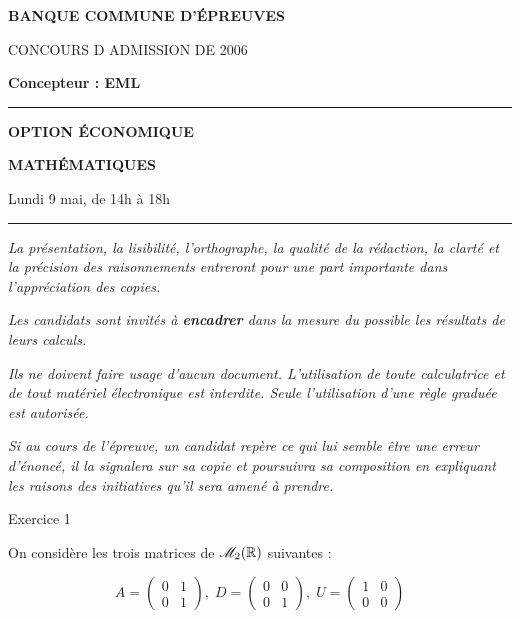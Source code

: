 \documentclass[11pt]{article}%
\begin{document}

\begin{center}
{\LARG\E\textbf{BANQUE COMMUNE D'ÉPREUVES}}



{\large \textsc{CONCOURS D ADMISSION DE 2006}}



{\large \textbf{Concepteur : EML}}



\rule{2.39cm}{0.05cm}



{\Large \textbf{OPTION ÉCONOMIQUE}}



{\Large \textbf{MATHÉMATIQUES }}



{\Large Lundi 9 mai, de 14h à 18h}



\rule{2.39cm}{0.05cm}
\end{center}

\textit{La présentation, la lisibilité, l'orthographe, la qualité
de la rédaction, la clarté et la précision des raisonnements
entreront pour une part importante dans l'appréciation des copies.}

\textit{Les candidats sont invités à \textbf{encadrer} dans la mesure
du possible les résultats de leurs calculs.}

\textit{Ils ne doivent faire usage d'aucun document. L'utilisation de
toute
calculatrice et de tout matériel électronique est interdite. Seule
l'utilisation d'une règle graduée est autorisée.}

\textit{Si au cours de l'épreuve, un candidat repère ce qui lui semble
être une erreur d'énoncé, il la signalera sur sa copie et
poursuivra sa composition en expliquant les raisons des initiatives
qu'il sera
amené à prendre.}

\vspace*{3cm}

{\LARGE Exercice 1}


On considère les trois matrices de $\mathscr{M}_{2}(\mathbb{R}) $ suivantes :

\[
A = \left( 
\begin{array}{cc}
0 & 1 \\
0 & 1
\end{array}
\right),\;D = \left( 
\begin{array}{cc}
0 & 0 \\
0 & 1
\end{array}
\right),\;U = \left( 
\begin{array}{cc}
1 & 0 \\
0 & 0
\end{array}
\right)
\]
\end{document}
